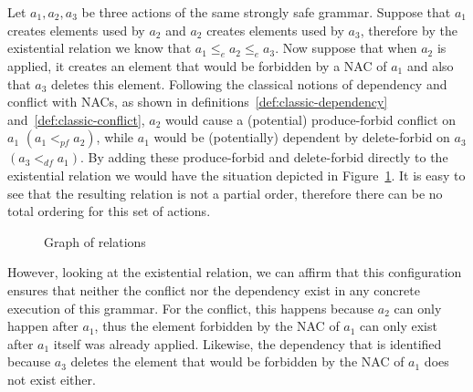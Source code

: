 \begin{example}
Let $a_1, a_2, a_3$ be three actions of the same strongly safe grammar. Suppose that $a_1$ creates elements used by $a_2$ and $a_2$ creates elements used by $a_3$, therefore by the existential relation we know that $a_1 \leq_e a_2 \leq_e a_3$. Now suppose that when $a_2$ is applied, it creates an element that would be forbidden by a NAC of $a_1$ and also that $a_3$ deletes this element. Following the classical notions of dependency and conflict with NACs, as shown in
  definitions~\ref{def:classic-dependency} and~\ref{def:classic-conflict}, $a_2$ would cause a (potential) produce-forbid conflict on $a_1$ $(a_1 <_{pf} a_2)$, while $a_1$ would be (potentially) dependent by delete-forbid on $a_3$ $(a_3 <_{df} a_1)$. By adding these produce-forbid and delete-forbid directly to the existential relation we would have the situation depicted in Figure~\ref{fig:process:order:occurrence-relation-fail}. It is easy to see that the resulting relation is not a partial order, therefore there can be no total ordering for this set of actions.
\begin{figure}[!ht]
  \centering
  \caption{Graph of relations}\label{fig:process:order:occurrence-relation-fail}
\end{figure}

However, looking at the existential relation, we can affirm that this configuration ensures that neither the conflict nor the dependency exist in any concrete execution of this grammar. For the conflict, this happens because $a_2$ can only happen after $a_1$, thus the element forbidden by the NAC of $a_1$ can only exist after $a_1$ itself was already applied. Likewise, the dependency that is identified because $a_3$ deletes the element that would be forbidden by the NAC of $a_1$ does not exist either.
\end{example}

